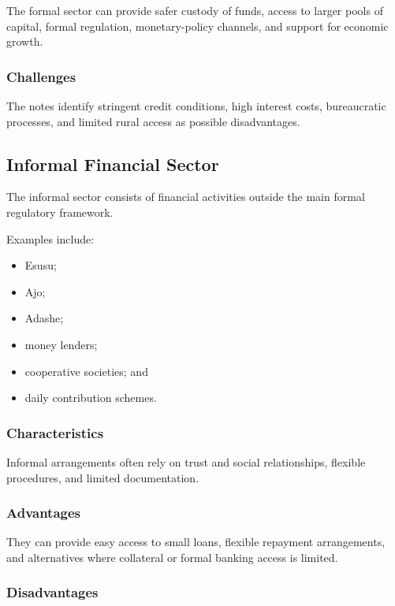 \documentclass[
]{article}
\providecommand{\tightlist}{%
  \setlength{\itemsep}{0pt}\setlength{\parskip}{0pt}}
\begin{document}
The formal sector can provide safer custody of funds, access to larger pools of capital, formal regulation, monetary-policy channels, and support for economic growth.

\subsubsection{Challenges}\label{challenges}

The notes identify stringent credit conditions, high interest costs, bureaucratic processes, and limited rural access as possible disadvantages.

\subsection{Informal Financial Sector}\label{informal-financial-sector}

The informal sector consists of financial activities outside the main formal regulatory framework.

Examples include:

\begin{itemize}
\tightlist
\item
  Esusu;
\item
  Ajo;
\item
  Adashe;
\item
  money lenders;
\item
  cooperative societies; and
\item
  daily contribution schemes.
\end{itemize}

\subsubsection{Characteristics}\label{characteristics-1}

Informal arrangements often rely on trust and social relationships, flexible procedures, and limited documentation.

\subsubsection{Advantages}\label{advantages-1}

They can provide easy access to small loans, flexible repayment arrangements, and alternatives where collateral or formal banking access is limited.

\subsubsection{Disadvantages}\label{disadvantages}
\end{document}

